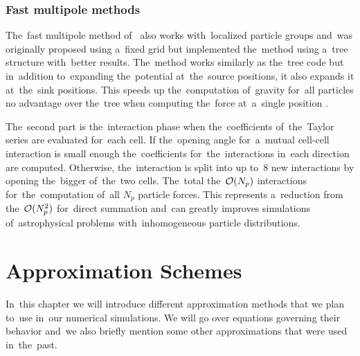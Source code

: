 \subsection{Fast multipole methods}
The~fast multipole method of~\textcite{1987JCoPh..73..325G} also works with~localized particle groups and~was originally proposed using a~fixed grid but \textcite{2000ApJ...536L..39D} implemented the~method using a~tree structure with~better results. The~method works similarly as the~tree code but in~addition to~expanding the~potential at~the~source positions, it also expands it at~the~sink positions. This \DIFdelbegin {}\DIFdelend speeds up the~\DIFdelbegin {}\DIFdelend computation of~gravity for~all particles \DIFdelbegin {}\DIFdelend \DIFaddbegin {}\DIFaddend no advantage over the~tree \DIFdelbegin {}\DIFdelend \DIFaddbegin {}\DIFaddend when computing the~force at~a~single position \DIFaddbegin \parencite{2011EPJP..126...55D}\DIFaddend .

The~second part \DIFaddbegin {}\DIFaddend is the~interaction phase when the~coefficients of~the~Taylor series are evaluated for~each cell. If the~opening angle for~a~mutual cell-cell interaction is small enough the~coefficients for~the~interactions in~each direction are computed.  Otherwise, the~interaction is split into up to~8 new interactions by opening the~bigger of~the~two cells. The~total \DIFdelbegin {}\DIFdelend \DIFaddbegin {}\DIFaddend the~\DIFdelbegin {}\DIFdelend \DIFaddbegin {}\DIFaddend $\mathcal{O}(N_p)$ interactions for~the~computation of~all $N_p$ particle forces. This represents a~\DIFdelbegin {}\DIFdelend \DIFaddbegin {}\DIFaddend reduction from the~$\mathcal{O}(N_p^2)$ for~direct summation and~can greatly improves simulations of~astrophysical problems with~inhomogeneous particle distributions.
%
\clearpage{}
\clearpage{}\chapter{Approximation Schemes}
\label{chpt:app_schemes}
In~this chapter we will introduce different approximation methods that we plan to~use in~our numerical simulations. We will go over equations governing their behavior and~we also briefly mention some other approximations that were used in~the~past.

